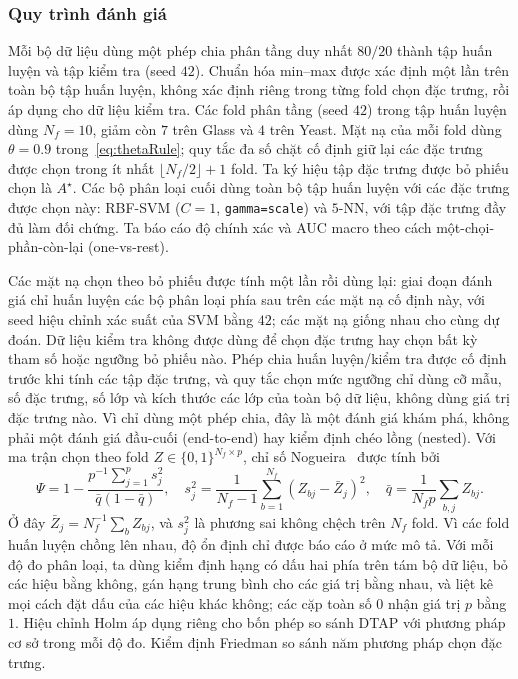 \documentclass[]{interact}
\theoremstyle{plain}
\theoremstyle{definition}
\theoremstyle{remark}
\begin{document}
\subsubsection{Quy trình đánh giá}\label{sssec:protocol}
Mỗi bộ dữ liệu dùng một phép chia phân tầng duy nhất $80/20$ thành tập huấn luyện và tập kiểm tra
(seed $42$). Chuẩn hóa min--max được xác định một lần trên toàn bộ tập huấn luyện, không
xác định riêng trong từng fold chọn đặc trưng, rồi áp dụng cho dữ liệu kiểm tra.
Các fold phân tầng (seed $42$) trong tập huấn luyện dùng $N_f=10$, giảm còn $7$ trên Glass
và $4$ trên Yeast. Mặt nạ của mỗi fold dùng $\theta=0.9$ trong~\eqref{eq:thetaRule};
quy tắc đa số chặt cố định giữ lại các đặc trưng được chọn trong ít nhất
$\lfloor N_f/2\rfloor+1$ fold. Ta ký hiệu tập đặc trưng được bỏ phiếu chọn là $A^\star$. Các bộ phân loại cuối dùng toàn bộ tập huấn luyện với các
đặc trưng được chọn này: RBF-SVM ($C=1$, \texttt{gamma=scale}) và $5$-NN, với tập
đặc trưng đầy đủ làm đối chứng. Ta báo cáo độ chính xác và AUC macro theo cách một-chọi-phần-còn-lại (one-vs-rest).

Các mặt nạ chọn theo bỏ phiếu được tính một lần rồi dùng lại: giai đoạn đánh giá chỉ huấn luyện
các bộ phân loại phía sau trên các mặt nạ cố định này, với seed hiệu chỉnh xác suất của SVM
bằng $42$; các mặt nạ giống nhau cho cùng dự đoán. Dữ liệu kiểm tra không được dùng để chọn đặc trưng hay chọn bất kỳ tham số hoặc ngưỡng bỏ phiếu nào.
Phép chia huấn luyện/kiểm tra được cố định trước khi tính các tập đặc trưng, và quy tắc chọn
mức ngưỡng chỉ dùng cỡ mẫu, số đặc trưng, số lớp
và kích thước các lớp của toàn bộ dữ liệu, không dùng giá trị đặc trưng nào. Vì chỉ dùng một phép chia,
đây là một đánh giá khám phá, không phải một đánh giá đầu-cuối (end-to-end) hay kiểm định chéo lồng (nested).
Với ma trận chọn theo fold $Z\in\{0,1\}^{N_f\times p}$, chỉ số Nogueira~\citep{nogueira2018}
được tính bởi
\[
\Psi=1-\frac{p^{-1}\sum_{j=1}^{p}s_j^2}{\bar q(1-\bar q)},\quad
s_j^2=\frac{1}{N_f-1}\sum_{b=1}^{N_f}(Z_{bj}-\bar Z_j)^2,\quad
\bar q=\frac{1}{N_f p}\sum_{b,j}Z_{bj}.
\]
Ở đây $\bar Z_j=N_f^{-1}\sum_b Z_{bj}$, và $s_j^2$ là phương sai không chệch trên $N_f$
fold.
Vì các fold huấn luyện chồng lên nhau, độ ổn định chỉ được báo cáo ở mức mô tả.
Với mỗi độ đo phân loại, ta dùng kiểm định hạng có dấu hai phía trên
tám bộ dữ liệu, bỏ các hiệu bằng không, gán hạng trung bình cho các giá trị bằng nhau, và
liệt kê mọi cách đặt dấu của các hiệu khác không; các cặp toàn số 0 nhận giá trị $p$ bằng $1$.
Hiệu chỉnh Holm áp dụng riêng cho bốn phép so sánh DTAP với phương pháp cơ sở trong
mỗi độ đo. Kiểm định Friedman so sánh năm phương pháp chọn đặc trưng.
\end{document}

